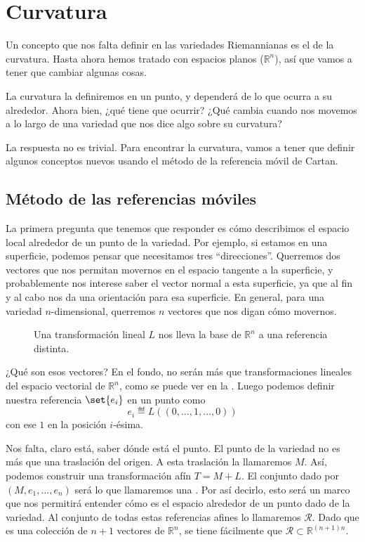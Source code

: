 \section{Curvatura}

Un concepto que nos falta definir en las variedades Riemannianas es el de la curvatura. Hasta ahora hemos tratado con espacios planos ($ℝ^n$), así que vamos a tener que cambiar algunas cosas.

La curvatura la definiremos en un punto, y dependerá de lo que ocurra a su alrededor. Ahora bien, ¿qué tiene que ocurrir? ¿Qué cambia cuando nos movemos a lo largo de una variedad que nos dice algo sobre su curvatura?

La respuesta no es trivial. Para encontrar la curvatura, vamos a tener que definir algunos conceptos nuevos usando el método de la referencia móvil de Cartan.

\subsection{Método de las referencias móviles}

La primera pregunta que tenemos que responder es cómo describimos el espacio local alrededor de un punto de la variedad. Por ejemplo, si estamos en una superficie, podemos pensar que necesitamos tres ``direcciones''. Querremos dos vectores que nos permitan movernos en el espacio tangente a la superficie, y probablemente nos interese saber el vector normal a esta superficie, ya que al fin y al cabo nos da una orientación para esa superficie. En general, para una variedad $n$-dimensional, querremos $n$ vectores que nos digan cómo movernos.

\begin{figure}[hbtp]
\centering
{}
\caption{Una transformación lineal $L$ nos lleva la base de $ℝ^n$ a una referencia distinta.}
\label{fig:Referencia}
\end{figure}

¿Qué son esos vectores? En el fondo, no serán más que transformaciones lineales del espacio vectorial de $ℝ^n$, como se puede ver en la . Luego podemos definir nuestra referencia $\set{e_i}$ en un punto como \[ e_i ≝ L\left((0,\dotsc,1,\dotsc,0)\right) \] con ese $1$ en la posición $i$-ésima.

Nos falta, claro está, saber dónde está el punto. El punto de la variedad no es más que una traslación del origen. A esta traslación la llamaremos $M$. Así, podemos construir una transformación afín $T = M + L$. El conjunto dado por $(M, e_1, \dotsc, e_n)$ será lo que llamaremos una . Por así decirlo, esto será un marco que nos permitirá entender cómo es el espacio alrededor de un punto dado de la variedad. Al conjunto de todas estas referencias afines lo llamaremos $\mathcal{R}$. Dado que es una colección de $n+1$ vectores de $ℝ^n$, se tiene fácilmente que $\mathcal{R} ⊂ ℝ^{(n+1)n}$.

